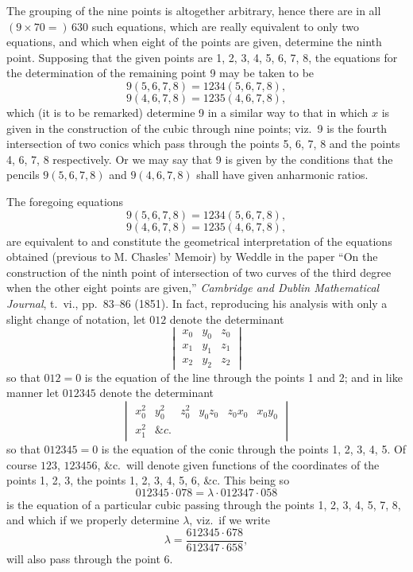 \documentclass[11pt]{article}
\begin{document}
The grouping of the nine points is altogether arbitrary, hence there are in all
$(9\times 70=)\,630$ such equations, which are really equivalent to only two equations, and
which when eight of the points are given, determine the ninth point. Supposing that
the given points are 1, 2, 3, 4, 5, 6, 7, 8, the equations for the determination of the
remaining point 9 may be taken to be
\[ 9(5,6,7,8) = 1234(5,6,7,8), \]
\[ 9(4,6,7,8) = 1235(4,6,7,8), \]
which (it is to be remarked) determine 9 in a similar way to that in which $x$ is
given in the construction of the cubic through nine points; viz.\ 9 is the fourth
intersection of two conics which pass through the points 5, 6, 7, 8 and the points
4, 6, 7, 8 respectively. Or we may say that 9 is given by the conditions that the
pencils $9(5,6,7,8)$ and $9(4,6,7,8)$ shall have given anharmonic ratios.

The foregoing equations
\[ 9(5,6,7,8) = 1234(5,6,7,8), \]
\[ 9(4,6,7,8) = 1235(4,6,7,8), \]
are equivalent to and constitute the geometrical interpretation of the equations obtained
(previous to M. Chasles' Memoir) by Weddle in the paper ``On the construction of
the ninth point of intersection of two curves of the third degree when the other
eight points are given,'' \textit{Cambridge and Dublin Mathematical Journal}, t.\ vi., pp.\ 83--86
(1851). In fact, reproducing his analysis with only a slight change of notation, let
$012$ denote the determinant
\[ \begin{vmatrix} x_{0} & y_{0} & z_{0} \\ x_{1} & y_{1} & z_{1} \\ x_{2} & y_{2} & z_{2} \end{vmatrix} \]
so that $012=0$ is the equation of the line through the points 1 and 2; and in like
manner let $012345$ denote the determinant
\[ \begin{vmatrix} x_{0}^{2} & y_{0}^{2} & z_{0}^{2} & y_{0}z_{0} & z_{0}x_{0} & x_{0}y_{0} \\ x_{1}^{2} & \&c. & & & & \end{vmatrix} \]
so that $012345=0$ is the equation of the conic through the points 1, 2, 3, 4, 5.
Of course $123$, $123456$, \&c.\ will denote given functions of the coordinates of the points
1, 2, 3, the points 1, 2, 3, 4, 5, 6, \&c. This being so
\[ 012345 \cdot 078 = \lambda\cdot 012347\cdot 058 \]
is the equation of a particular cubic passing through the points 1, 2, 3, 4, 5, 7, 8, and
which if we properly determine $\lambda$, viz.\ if we write
\[ \lambda = \dfrac{612345\cdot 678}{612347\cdot 658}, \]
will also pass through the point 6.
\end{document}
